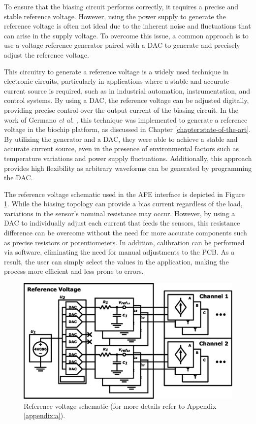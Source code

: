 
\noindent
To ensure that the biasing circuit performs correctly, it requires a precise and stable reference voltage. However, using the power supply to generate the reference voltage is often not ideal due to the inherent noise and fluctuations that can arise in the supply voltage. To overcome this issue, a common approach is to use a voltage reference generator paired with a \ac{DAC} to generate and precisely adjust the reference voltage.

This circuitry to generate a reference voltage is a widely used technique in electronic circuits, particularly in applications where a stable and accurate current source is required, such as in industrial automation, instrumentation, and control systems. By using a \ac{DAC}, the reference voltage can be adjusted digitally, providing precise control over the output current of the biasing circuit. In the work of Germano \textit{et al.} \cite{Germano2006MICROSYSTEMFB}, this technique was implemented to generate a reference voltage in the biochip platform, as discussed in Chapter \ref{chapter:state-of-the-art}. By utilizing the generator and a \ac{DAC}, they were able to achieve a stable and accurate current source, even in the presence of environmental factors such as temperature variations and power supply fluctuations. Additionally, this approach provides high flexibility as arbitrary waveforms can be generated by programming the \ac{DAC}.

The reference voltage schematic used in the \ac{AFE} interface is depicted in Figure \ref{figure:vref-schematic}. While the biasing topology can provide a bias current regardless of the load, variations in the sensor's nominal resistance may occur. However, by using a \ac{DAC} to individually adjust each current that feeds the sensors, this resistance difference can be overcome without the need for more accurate components such as precise resistors or potentiometers. In addition, calibration can be performed via software, eliminating the need for manual adjustments to the \ac{PCB}. As a result, the user can simply select the values in the application, making the process more efficient and less prone to errors.

\begin{figure}[!ht]
    \centering
    \includegraphics[width=.8\textwidth]{images/chapter_4/channel/vref.eps}
    \caption{Reference voltage schematic (for more details refer to Appendix \ref{appendix:a}).}
    \label{figure:vref-schematic}
\end{figure}

